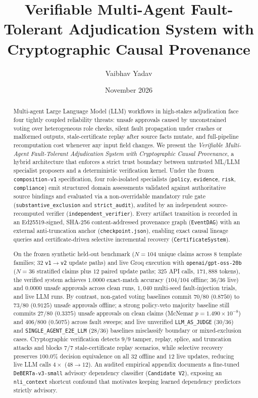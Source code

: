 \documentclass[11pt,a4paper]{article}
\title{Verifiable Multi-Agent Fault-Tolerant Adjudication System with Cryptographic Causal Provenance}
\author{Vaibhav Yadav}
\date{November 2026}
\begin{document}
\maketitle

\begin{abstract}
Multi-agent Large Language Model (LLM) workflows in high-stakes adjudication face four tightly coupled reliability threats: unsafe approvals caused by unconstrained voting over heterogeneous role checks, silent fault propagation under crashes or malformed outputs, stale-certificate replay after source facts mutate, and full-pipeline recomputation cost whenever any input field changes. We present the \emph{Verifiable Multi-Agent Fault-Tolerant Adjudication System with Cryptographic Causal Provenance}, a hybrid architecture that enforces a strict trust boundary between untrusted ML/LLM specialist proposers and a deterministic verification kernel. Under the frozen \texttt{composition-v1} specification, four role-isolated specialists (\texttt{policy}, \texttt{evidence}, \texttt{risk}, \texttt{compliance}) emit structured domain assessments validated against authoritative source bindings and evaluated via a non-overridable mandatory rule gate (\texttt{substantive\_exclusion} and \texttt{strict\_audit}), audited by an independent source-recomputed verifier (\texttt{independent\_verifier}). Every artifact transition is recorded in an Ed25519-signed, SHA-256 content-addressed provenance graph (\texttt{EventDAG}) with an external anti-truncation anchor (\texttt{checkpoint.json}), enabling exact causal lineage queries and certificate-driven selective incremental recovery (\texttt{CertificateSystem}).

On the frozen synthetic held-out benchmark ($N=104$ unique claims across 8 template families; $32$ \texttt{v1}$\rightarrow$\texttt{v2} update paths) and live Groq execution with \texttt{openai/gpt-oss-20b} ($N=36$ stratified claims plus $12$ paired update paths; $325$ API calls, $171{,}888$ tokens), the verified system achieves $1.0000$ exact-match accuracy ($104/104$ offline; $36/36$ live) and $0.0000$ unsafe approvals across clean runs, $1{,}040$ multi-seed fault-injection trials, and live LLM runs. By contrast, non-gated voting baselines commit $70/80$ ($0.8750$) to $73/80$ ($0.9125$) unsafe approvals offline; a strong policy-veto majority baseline still commits $27/80$ ($0.3375$) unsafe approvals on clean claims (McNemar $p = 1.490\times 10^{-8}$) and $406/800$ ($0.5075$) across fault sweeps; and live unverified \texttt{LLM\_AS\_JUDGE} ($30/36$) and \texttt{SINGLE\_AGENT\_E2E\_LLM} ($28/36$) baselines misclassify boundary or mixed-exclusion cases. Cryptographic verification detects $9/9$ tamper, replay, splice, and truncation attacks and blocks $7/7$ stale-certificate replay scenarios, while selective recovery preserves $100.0\%$ decision equivalence on all $32$ offline and $12$ live updates, reducing live LLM calls $4\times$ ($48 \rightarrow 12$). An audited empirical appendix documents a fine-tuned \texttt{DeBERTa-v3-small} advisory dependency classifier (\texttt{Candidate V2}), exposing an \texttt{nli\_context} shortcut confound that motivates keeping learned dependency predictors strictly advisory.
\end{abstract}
\end{document}

